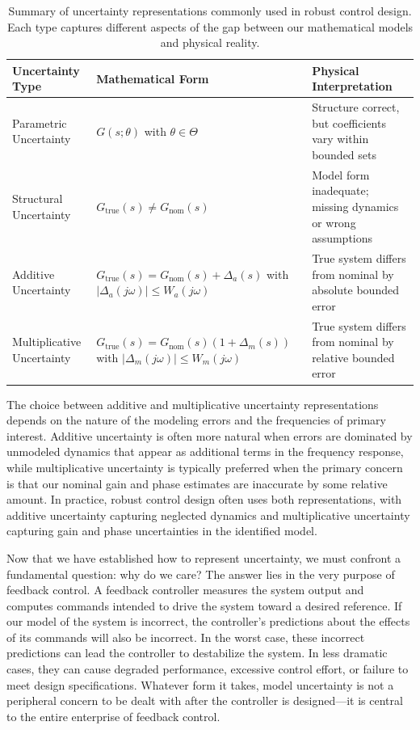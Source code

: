 \begin{table}[htbp]
\centering
\begin{tabular}{|p{}|p{}|p{}|}
\hline
\textbf{Uncertainty Type} & \textbf{Mathematical Form} & \textbf{Physical Interpretation} \\
\hline
Parametric Uncertainty & $G(s; \theta)$ with $\theta \in \Theta$ & Structure correct, but coefficients vary within bounded sets \\
\hline
Structural Uncertainty & $G_{\text{true}}(s) \neq G_{\text{nom}}(s)$ & Model form inadequate; missing dynamics or wrong assumptions \\
\hline
Additive Uncertainty & $G_{\text{true}}(s) = G_{\text{nom}}(s) + \Delta_a(s)$ with $|\Delta_a(j\omega)| \leq W_a(j\omega)$ & True system differs from nominal by absolute bounded error \\
\hline
Multiplicative Uncertainty & $G_{\text{true}}(s) = G_{\text{nom}}(s)(1 + \Delta_m(s))$ with $|\Delta_m(j\omega)| \leq W_m(j\omega)$ & True system differs from nominal by relative bounded error \\
\hline
\end{tabular}
\caption{Summary of uncertainty representations commonly used in robust control design. Each type captures different aspects of the gap between our mathematical models and physical reality.}
\label{tab:uncertainty_types}
\end{table}

The choice between additive and multiplicative uncertainty representations depends on the nature of the modeling errors and the frequencies of primary interest. Additive uncertainty is often more natural when errors are dominated by unmodeled dynamics that appear as additional terms in the frequency response, while multiplicative uncertainty is typically preferred when the primary concern is that our nominal gain and phase estimates are inaccurate by some relative amount. In practice, robust control design often uses both representations, with additive uncertainty capturing neglected dynamics and multiplicative uncertainty capturing gain and phase uncertainties in the identified model.

Now that we have established how to represent uncertainty, we must confront a fundamental question: why do we care? The answer lies in the very purpose of feedback control. A feedback controller measures the system output and computes commands intended to drive the system toward a desired reference. If our model of the system is incorrect, the controller's predictions about the effects of its commands will also be incorrect. In the worst case, these incorrect predictions can lead the controller to destabilize the system. In less dramatic cases, they can cause degraded performance, excessive control effort, or failure to meet design specifications. Whatever form it takes, model uncertainty is not a peripheral concern to be dealt with after the controller is designed—it is central to the entire enterprise of feedback control.

